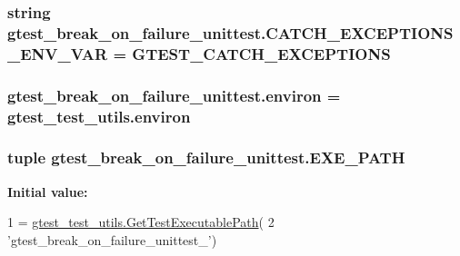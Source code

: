 \subsubsection[{C\+A\+T\+C\+H\+\_\+\+E\+X\+C\+E\+P\+T\+I\+O\+N\+S\+\_\+\+E\+N\+V\+\_\+\+V\+A\+R}]{\setlength{\rightskip}{0pt plus 5cm}string gtest\+\_\+break\+\_\+on\+\_\+failure\+\_\+unittest.\+C\+A\+T\+C\+H\+\_\+\+E\+X\+C\+E\+P\+T\+I\+O\+N\+S\+\_\+\+E\+N\+V\+\_\+\+V\+A\+R = \textquotesingle{}G\+T\+E\+S\+T\+\_\+\+C\+A\+T\+C\+H\+\_\+\+E\+X\+C\+E\+P\+T\+I\+O\+N\+S\textquotesingle{}}\label{namespacegtest__break__on__failure__unittest_a0c1cd8079b97c6924156075c6c9733c3}
\hypertarget{namespacegtest__break__on__failure__unittest_a6d74240e4ea26e0a68e1025f9b8c878d}{}
\subsubsection[{environ}]{\setlength{\rightskip}{0pt plus 5cm}gtest\+\_\+break\+\_\+on\+\_\+failure\+\_\+unittest.\+environ = gtest\+\_\+test\+\_\+utils.\+environ}\label{namespacegtest__break__on__failure__unittest_a6d74240e4ea26e0a68e1025f9b8c878d}
\hypertarget{namespacegtest__break__on__failure__unittest_aa546748fb3f26cc797f240387333fc3a}{}
\subsubsection[{E\+X\+E\+\_\+\+P\+A\+T\+H}]{\setlength{\rightskip}{0pt plus 5cm}tuple gtest\+\_\+break\+\_\+on\+\_\+failure\+\_\+unittest.\+E\+X\+E\+\_\+\+P\+A\+T\+H}\label{namespacegtest__break__on__failure__unittest_aa546748fb3f26cc797f240387333fc3a}
{\bfseries Initial value\+:}
\begin{DoxyCode}
1 = \hyperlink{namespacegtest__test__utils_a1bdf3cac86afa675ed37629b183048e9}{gtest\_test\_utils.GetTestExecutablePath}(
2     \textcolor{stringliteral}{'gtest\_break\_on\_failure\_unittest\_'})
\end{DoxyCode}
\hypertarget{namespacegtest__break__on__failure__unittest_aec67fcd1a946db2d8c747f6519a5bb05}{}
